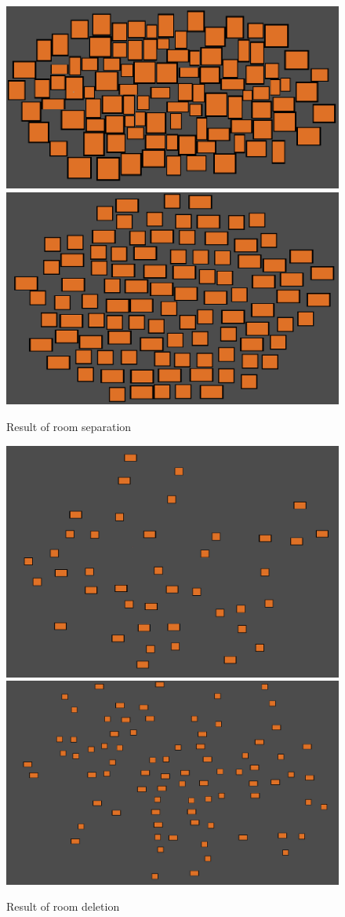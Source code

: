 \documentclass{article}
\begin{document}
\begin{figure}
\centering
\includegraphics[height = 0.2\textwidth]{rooms seperated}
\includegraphics[height = 0.2\textwidth]{spread rooms}
\caption{Result of room separation}
\label{room seperation result}
\end{figure}

\begin{figure}
\centering
\includegraphics[height = 0.3\textwidth]{deleted rooms}
\includegraphics[height = 0.3\textwidth]{deleted rooms1}
\caption{Result of room deletion}
\label{room deletion result}
\end{figure}
\end{document}
